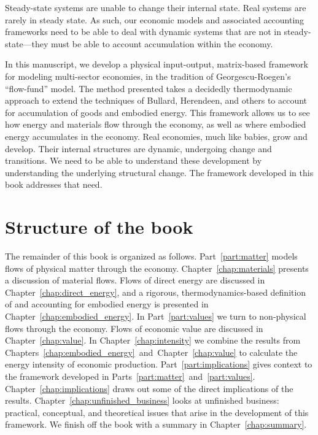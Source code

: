 Steady-state systems are unable to change
their internal state.
Real systems are rarely in steady state.
As such, our economic models
and associated accounting frameworks
need to be able to deal with dynamic systems
that are not in steady-state---they must
be able to account accumulation within the economy.

In this manuscript, we develop a physical input-output, 
matrix-based framework for modeling multi-sector economies, 
in the tradition of Georgescu-Roegen's ``flow-fund'' 
model.\cite{G-R1979a, G-R1979b} 
The method presented takes a decidedly thermodynamic approach
to extend the techniques of Bullard, Herendeen, and others 
to account for accumulation of goods
and embodied energy. 
This framework allows us to see how energy 
and materials flow through the economy, 
as well as where embodied energy accumulates in the economy.
Real economies, 
much like babies,
grow and develop.
Their internal structures are dynamic,
undergoing change and transitions.
We need to be able to understand these development
by understanding the underlying structural change.
The framework developed in this book
addresses that need.

\section{Structure of the book}
\label{sec:structure}

The remainder of this book is organized as follows. 
Part~\ref{part:matter} models flows of physical matter
through the economy.
Chapter~\ref{chap:materials} presents a discussion of material flows.
Flows of direct energy are discussed in Chapter~\ref{chap:direct_energy}, 
and a rigorous, thermodynamics-based definition of and accounting for 
embodied energy is presented in Chapter~\ref{chap:embodied_energy}.
In Part~\ref{part:values} we turn to non-physical flows through the economy. 
Flows of economic value are discussed in Chapter~\ref{chap:value}.
In Chapter~\ref{chap:intensity} we combine the results from 
Chapters~\ref{chap:embodied_energy}~and~Chapter~\ref{chap:value} to
calculate the energy intensity of economic production.
Part~\ref{part:implications} gives context to the framework developed in
Parts~\ref{part:matter}~and~\ref{part:values}.
Chapter~\ref{chap:implications} draws out some of the direct implications
of the results.
Chapter~\ref{chap:unfinished_business} looks at 
unfinished business: practical, conceptual, and theoretical issues
that arise in the development of this framework.
We finish off the book with a summary in Chapter~\ref{chap:summary}.

